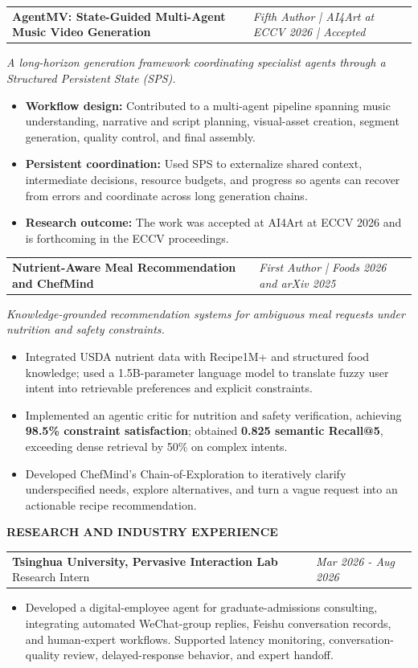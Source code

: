\documentclass[10pt,a4paper]{article}
\makeatletter
\newcommand{\cvsection}[1]{%
  \vspace{0.65em}%
  \noindent
  {\color{navy}\fontsize{11.8}{13.2}\selectfont\bfseries\MakeUppercase{#1}}\par
  \vspace{0.09em}{\color{teal}\hrule height 0.7pt}\vspace{0.34em}%
}
\newcommand{\project}[2]{%
  \vspace{0.32em}%
  \begin{tabularx}{\textwidth}{@{}X>{\raggedleft\arraybackslash}p{5.35cm}@{}}
    {\color{navy}\fontsize{10.35}{11.6}\selectfont\bfseries #1} &
    {\color{muted}\fontsize{8.65}{10.1}\selectfont\itshape #2}
  \end{tabularx}%
  \vspace{-0.16em}%
}
\newcommand{\experience}[3]{%
  \vspace{0.25em}%
  \begin{tabularx}{\textwidth}{@{}X>{\raggedleft\arraybackslash}p{4.4cm}@{}}
    {\color{navy}\bfseries #1} {\color{muted}#2} &
    {\color{muted}\itshape #3}
  \end{tabularx}%
  \vspace{-0.18em}%
}
\newcommand{\summaryline}[1]{%
  {\color{muted}\fontsize{8.9}{10.6}\selectfont\itshape #1}\par\vspace{0.05em}%
}
\newcommand{\metric}[1]{{\color{teal}\bfseries #1}}
\makeatother
\begin{document}
\project{AgentMV: State-Guided Multi-Agent Music Video Generation}{Fifth Author | AI4Art at ECCV 2026 | Accepted}
\summaryline{A long-horizon generation framework coordinating specialist agents through a Structured Persistent State (SPS).}
\begin{itemize}
  \item \textbf{Workflow design:} Contributed to a multi-agent pipeline spanning music understanding, narrative and script planning, visual-asset creation, segment generation, quality control, and final assembly.
  \item \textbf{Persistent coordination:} Used SPS to externalize shared context, intermediate decisions, resource budgets, and progress so agents can recover from errors and coordinate across long generation chains.
  \item \textbf{Research outcome:} The work was accepted at AI4Art at ECCV 2026 and is forthcoming in the ECCV proceedings.
\end{itemize}

\project{Nutrient-Aware Meal Recommendation and ChefMind}{First Author | Foods 2026 and arXiv 2025}
\summaryline{Knowledge-grounded recommendation systems for ambiguous meal requests under nutrition and safety constraints.}
\begin{itemize}
  \item Integrated USDA nutrient data with Recipe1M+ and structured food knowledge; used a 1.5B-parameter language model to translate fuzzy user intent into retrievable preferences and explicit constraints.
  \item Implemented an agentic critic for nutrition and safety verification, achieving \metric{98.5\% constraint satisfaction}; obtained \metric{0.825 semantic Recall@5}, exceeding dense retrieval by 50\% on complex intents.
  \item Developed ChefMind's Chain-of-Exploration to iteratively clarify underspecified needs, explore alternatives, and turn a vague request into an actionable recipe recommendation.
\end{itemize}

\cvsection{Research and Industry Experience}
\experience{Tsinghua University, Pervasive Interaction Lab}{\; Research Intern}{Mar 2026 - Aug 2026}
\begin{itemize}
  \item Developed a digital-employee agent for graduate-admissions consulting, integrating automated WeChat-group replies, Feishu conversation records, and human-expert workflows. Supported latency monitoring, conversation-quality review, delayed-response behavior, and expert handoff.
\end{itemize}
\end{document}
